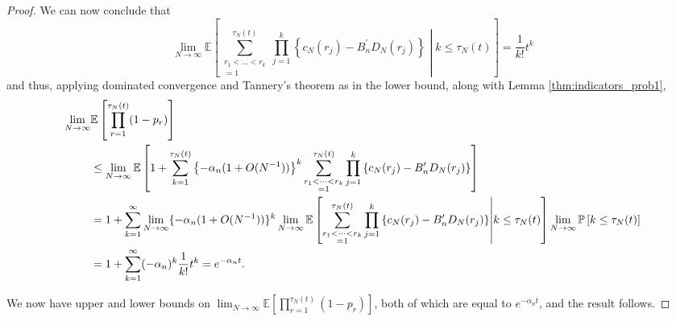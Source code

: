 \documentclass{article}
\newcommand{\Prob}{\mathbb{P}}
\newcommand{\E}{\mathbb{E}}
\newcommand{\1}[1]{\mathbbm{1}_{#1}}
\begin{document}
\begin{proof}
We can now conclude that
\begin{equation}
\lim_{N\to\infty} \E \left[ \sum_{\substack{r_1<\dots<r_k \\ =1}}^{\tau_N(t)}\prod_{j=1}^k 
\left\{ c_N(r_j) - B_n^\prime D_N(r_j) \right\} \middle| k\leq \tau_N(t) \right]
= \frac{1}{k!} t^k
\end{equation}
and thus, applying dominated convergence and Tannery's theorem as in the lower bound, along with Lemma \ref{thm:indicators_prob1},
\begin{align}
\lim_{N\to\infty} &\E\left[ \prod_{r=1}^{\tau_N(t)} (1-p_r) \right] \notag\\
&\leq \lim_{N\to\infty} \E\left[
1 + \sum_{k=1}^{\tau_N(t)} \left\{- \alpha_n (1+O(N^{-1}))\right\}^k \sum_{\substack{r_1<\dots<r_k \\ =1}}^{\tau_N(t)}\prod_{j=1}^k 
\left\{ c_N(r_j) - B_n^\prime D_N(r_j) \right\} \right] \notag\\
&= 1 + \sum_{k=1}^\infty \lim_{N\to\infty} \{ -\alpha_n(1+O(N^{-1})) \}^k
\lim_{N\to\infty} \E \left[ \sum_{\substack{r_1<\dots<r_k \\ =1}}^{\tau_N(t)}\prod_{j=1}^k 
\left\{ c_N(r_j) - B_n^\prime D_N(r_j) \right\} \middle| k\leq \tau_N(t) \right]
\lim_{N\to\infty} \Prob\left[ k\leq \tau_N(t) \right] \notag\\
&= 1+ \sum_{k=1}^\infty (-\alpha_n)^k \frac{1}{k!} t^k
= e^{-\alpha_n t} .
\end{align}

We now have upper and lower bounds on $\lim_{N\to\infty} \E\left[ \prod_{r=1}^{\tau_N(t)} (1-p_r) \right]$, both of which are equal to $e^{-\alpha_n t}$, and the result follows.
\end{proof}
\end{document}
